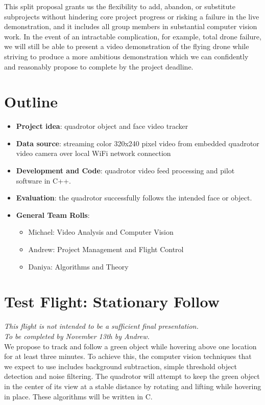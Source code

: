 \documentclass{article}
\begin{document}
\begin{spacing}{1.1}
This split proposal grants us the flexibility to add, abandon, or
substitute subprojects without hindering core project progress or
risking a failure in the live demonstration, and it includes all group
members in substantial computer vision work. In the event of an
intractable complication, for example, total drone failure, we will
still be able to present a video demonstration of the flying drone
while striving to produce a more ambitious demonstration which we can
confidently and reasonably propose to complete by the project
deadline.

\section{Outline}
\begin{itemize}
\item \textbf{Project idea}: quadrotor object and face video tracker
\item \textbf{Data source}: streaming color 320x240 pixel video from
  embedded quadrotor video camera over local WiFi network connection
\item \textbf{Development and Code}: quadrotor video feed
  processing and pilot software in C++.
\item \textbf{Evaluation}: the quadrotor successfully follows the
  intended face or object.
\item \textbf{General Team Rolls}: 
  \begin{itemize}
  \item Michael: Video Analysis and Computer Vision
  \item Andrew: Project Management and Flight Control
  \item Daniya: Algorithms and Theory
  \end{itemize}
\end{itemize}


\section{Test Flight: Stationary Follow}

\textit{This flight is not intended to be a sufficient final
  presentation.\\\noindent To be completed by November 13th by Andrew.}\\

We propose to track and follow a green object while hovering above one
location for at least three minutes. To achieve this, the computer
vision techniques that we expect to use includes background
subtraction, simple threshold object detection and noise
filtering. The quadrotor will attempt to keep the green object in the
center of its view at a stable distance by rotating and lifting while
hovering in place. These algorithms will be written in C.


\end{spacing}
\end{document}
